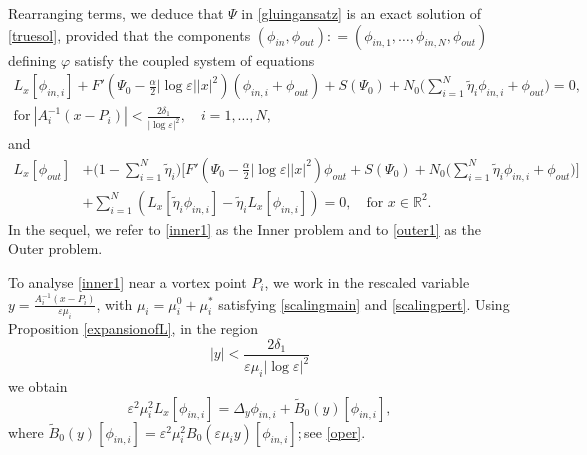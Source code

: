 \documentclass[11pt,reqno,a4paper]{amsart}
\numberwithin{equation}{section}
\newcommand{\defeq}{\mathrel{\mathop:}=}
\newcommand{\ve}{\varepsilon}
\begin{document}
Rearranging terms, we deduce that $\Psi$ in \eqref{gluingansatz} is an exact solution of \eqref{truesol}, provided that the components $(\phi_{in},\phi_{out})\defeq (\phi_{in,1},\dots,\phi_{in,N},\phi_{out})$ defining $\varphi$ satisfy the coupled system of equations
\begin{align} \label{inner1}
L_x[\phi_{in,i}]+F'\left(\Psi_0-\frac{\alpha}{2}|\log\ve||x|^2\right)(\phi_{in,i}+\phi_{out})
+S(\Psi_0)+N_0\Big(\sum_{i=1}^{N}\tilde{\eta}_i\phi_{in,i}+\phi_{out}\Big)=0,&&\\
\nonumber
\mathrm{for}
\ |A_i^{-1}(x-P_i)|<\frac{2\delta_1}{|\log\ve|^2}, \quad i=1,\dots,N,&&
\end{align}
and
 \begin{equation}
     \begin{aligned} \label{outer1}
 L_x[\phi_{out}]&+\Big(1-\sum_{i=1}^N\tilde{\eta}_i\Big)\bigg[F'\left(\Psi_0-\frac{\alpha}{2}|\log\ve||x|^2\right)\phi_{out}+S(\Psi_0)
 +N_0\Big(\sum_{i=1}^{N}\tilde{\eta}_i\phi_{in,i}+\phi_{out}\Big)\bigg]\\
 &+ \sum_{i=1}^N\left(L_x[\tilde{\eta}_i\phi_{in,i}]-\tilde{\eta}_iL_x[\phi_{in,i}]\right)=0,\quad\mbox{for}\,\,x\in\mathbb{R}^2.
\end{aligned}
\end{equation}
In the sequel, we refer to \eqref{inner1} as the Inner problem and to \eqref{outer1} as the Outer problem. 

To analyse \eqref{inner1} near a vortex point 
$P_i$, we work in the rescaled variable $y=\frac{A_i^{-1}(x-P_i)}{\ve\mu_i}$, with $\mu_i=\mu_i^{0}+\mu_i^{*}$ satisfying \eqref{scalingmain} and \eqref{scalingpert}. Using Proposition \ref{expansionofL}, in the region \[|y|<\frac{2\delta_1}{\ve\mu_i|\log\ve|^2}\]  we obtain \[\ve^{2}\mu_i^2 L_{x}[\phi_{in,i}]=\Delta_{y}\phi_{in,i} +\widetilde{B}_{0}(y)[\phi_{in,i}],\] 
where $\widetilde{B}_{0}(y)[\phi_{in,i}]=\ve^2\mu_i^2 B_{0}\left(\ve \mu_i y\right)[\phi_{in,i}]$;\,see \eqref{oper}.
\end{document}
